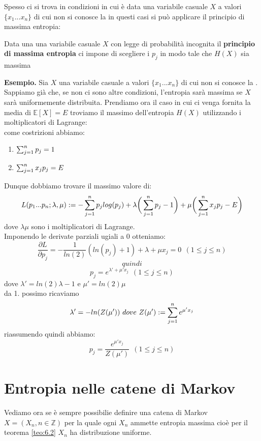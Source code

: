 Spesso ci si trova in condizioni in cui è data una variabile casuale $X$ a valori $\{ x_1...x_n \}$ di cui non si conosce la \lep  in questi casi si può applicare il principio di massima entropia:\\
\begin{defi}
Data una una variabile casuale $X$ con legge di probabilità \lep  incognita il \textbf{principio di massima entropia} ci impone di scegliere i $p_j$ in modo tale che $H(X)$ sia massima
\end{defi}
\textbf{Esempio.} 
Sia $X$ una variabile casuale a valori $\{ x_1...x_n \}$ di cui non si conosce la \lep . Sappiamo già che, se non ci sono altre condizioni, l'entropia sarà massima se $X$ sarà uniformemente distribuita. Prendiamo ora il caso in cui ci venga fornita la media di $\mathbb{E}[ X]=E$ troviamo il massimo dell'entropia $H(X)$ utilizzando i moltiplicatori di Lagrange:\\
come costrizioni abbiamo:
\begin{enumerate}
\item $\sum_{j=1}^n p_j=1$
\item $\sum_{j=1}^n x_j p_j=E$
\end{enumerate}
Dunque dobbiamo trovare il massimo valore di:
\begin{equation}
L(p_1...p_n;\lambda,\mu ):= -\sum_{j=1}^n p_j log(p_j) + \lambda \bigg( \sum_{j=1}^n p_j -1 \bigg) + \mu \bigg( \sum_{j=1}^n x_j p_j - E \bigg)
\end{equation}
dove $\lambda \mu$ sono i moltiplicatori di Lagrange.\\
Imponendo le derivate parziali ugiali a 0 otteniamo:
$$\frac{\partial L}{\partial p_j}=-\frac{1}{ln(2)}(ln(p_j)+1)+\lambda + \mu x_j=0 \ \  (1\leq j \leq n) $$
$$quindi$$
$$p_j=e^{\lambda ' + \mu ' x_j} \ \ (1\leq j \leq n)$$
dove $\lambda ' = ln(2) \lambda -1 $ e $\mu ' = ln(2) \mu$\\
da 1. possimo ricaviamo 
$$\lambda ' = - ln(Z( \mu ')) \ dove \ Z( \mu '):= \sum_{j=1}^n e^{\mu ' x_j}$$
riassumendo quindi abbiamo:
\begin{equation}
p_j=\frac{e^{\mu ' x_j}}{Z( \mu ')} \ \ (1\leq j \leq n)
\end{equation}



\section{Entropia nelle catene di Markov}
\label{sec:markEntropia}
Vediamo ora se è sempre possibilie definire una catena di Markov $X=(X_n,n\in\mathbb{Z})$ per la quale ogni $X_n$ ammette entropia massima cioè per il teorema \ref{teo:6.2} $X_n$ ha distribuzione uniforme.

